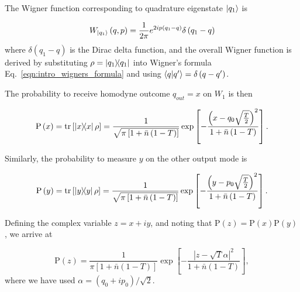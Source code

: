 The Wigner function corresponding to quadrature eigenstate $\ket{q_1}$ is

\begin{equation}
W_{\ket{q_1}}\left(q, p\right) = \frac{1}{2 \pi} e^{2 i p\left(q_1 - q\right)} \delta\left(q_1 - q\right)
\end{equation}
where $\delta\left(q_1 - q\right)$ is the Dirac delta function, and the overall Wigner function is derived by substituting $\rho = \dyad{q_1}$ into Wigner's formula Eq.~\ref{eqn:intro_wigners_formula} and using $\ip{q}{q^\prime} = \delta\left(q - q^\prime\right)$.

The probability to receive homodyne outcome $q_{out}=x$ on $W_1$ is then 


\begin{equation}\label{eqn:prob_homodyne_x}
\text{P}\left(x\right) = \tr\left[ \dyad{x} \rho \right] = \frac{1}{\sqrt{\pi \left[1 + \bar{n}\left(1-T\right)\right]}}\exp\left[- \frac{\left(x - q_0 \sqrt{\frac{T}{2}}\right)^2}{1 + \bar{n}\left(1-T\right)} \right].
\end{equation}

\noindent Similarly, the probability to measure $y$ on the other output mode is

\begin{equation}
\text{P}\left(y\right) = \tr\left[ \dyad{y} \rho \right]= \frac{1}{\sqrt{\pi \left[1 + \bar{n}\left(1-T\right)\right]}}\exp\left[- \frac{\left(y - p_0 \sqrt{\frac{T}{2}}\right)^2}{1 + \bar{n}\left(1-T\right)} \right].
\end{equation}

\noindent Defining the complex variable $z = x + i y$, and noting that $\text{P}\left(z\right) = \text{P}\left(x\right)\text{P}\left(y\right)$, we arrive at 

\begin{equation}\label{eqn:prob_noisy_output}
\text{P}\left(z\right) = \frac{1}{\pi \left[1 + \bar{n}\left(1-T\right)\right]} \exp\left[- \frac{\left| z - \sqrt{T} \alpha \right|^2}{1 + \bar{n}\left(1-T\right)} \right],
\end{equation}
where we have used $\alpha = \left(q_0 + i p_0\right)/\sqrt{2}$.

